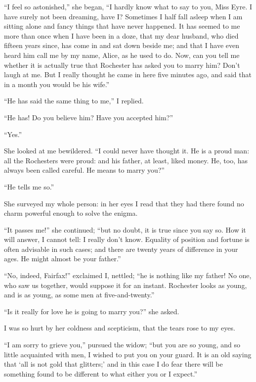 \enquote{I feel so astonished,} she began, \enquote{I hardly know what
	to say to you, Miss Eyre.  I have surely not been dreaming, have I?
	Sometimes I half fall asleep when I am sitting alone and fancy things
	that have never happened.  It has seemed to me more than once when I
	have been in a doze, that my dear husband, who died fifteen years since,
	has come in and sat down beside me; and that I have even heard him call
	me by my name, Alice, as he used to do.  Now, can you tell me whether it
	is actually true that \Mr{} Rochester has asked you to marry him?  Don't
	laugh at me.  But I really thought he came in here five minutes ago, and
	said that in a month you would be his wife.}

\enquote{He has said the same thing to me,} I replied.

\enquote{He has!  Do you believe him?  Have you accepted him?}

\enquote{Yes.}

She looked at me bewildered.  \enquote{I could never have thought it.
	He is a proud man: all the Rochesters were proud: and his father, at
	least, liked money.  He, too, has always been called careful.  He means
	to marry you?}

\enquote{He tells me so.}

She surveyed my whole person: in her eyes I read that they had there
found no charm powerful enough to solve the enigma.

\enquote{It passes me!} she continued; \enquote{but no doubt, it is true
	since you say so.  How it will answer, I cannot tell: I really don't
	know.  Equality of position and fortune is often advisable in such
	cases; and there are twenty years of difference in your ages.  He might
	almost be your father.}

\enquote{No, indeed, \Mrs{} Fairfax!} exclaimed I, nettled; \enquote{he is
	nothing like my father!  No one, who saw us together, would suppose it
	for an instant.  \Mr{} Rochester looks as young, and is as young, as some
	men at five-and-twenty.}

\enquote{Is it really for love he is going to marry you?} she asked.

I was so hurt by her coldness and scepticism, that the tears rose to my
eyes.

\enquote{I am sorry to grieve you,} pursued the widow; \enquote{but you
	are so young, and so little acquainted with men, I wished to put you on
	your guard.  It is an old saying that \enquote{all is not gold that
		glitters;} and in this case I do fear there will be something found to
	be different to what either you or I expect.}

